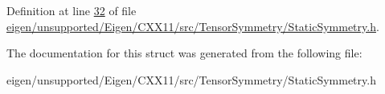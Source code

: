Definition at line \hyperlink{eigen_2unsupported_2_eigen_2_c_x_x11_2src_2_tensor_symmetry_2_static_symmetry_8h_source_l00032}{32} of file \hyperlink{eigen_2unsupported_2_eigen_2_c_x_x11_2src_2_tensor_symmetry_2_static_symmetry_8h_source}{eigen/unsupported/\+Eigen/\+C\+X\+X11/src/\+Tensor\+Symmetry/\+Static\+Symmetry.\+h}.



The documentation for this struct was generated from the following file\+:\begin{DoxyCompactItemize}
\item 
eigen/unsupported/\+Eigen/\+C\+X\+X11/src/\+Tensor\+Symmetry/\+Static\+Symmetry.\+h\end{DoxyCompactItemize}
